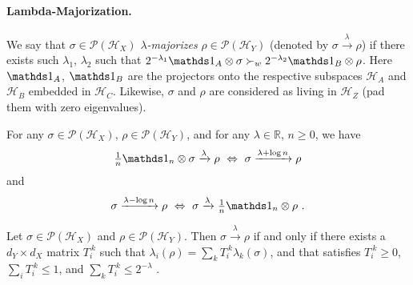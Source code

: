 \documentclass[12pt,a4paper]{article}
\def\Hs{\mathscr{H}}%
\newcommand{\lambdamaj}[1]{\xrightarrow{#1}}
\newcommand{\POps}{\mathscr{P}}
\begin{document}
\paragraph{Lambda-Majorization.} We say that $\sigma\in\POps(\Hs_X)$ {\em $\lambda$-majorizes}
$\rho\in\POps(\Hs_Y)$ (denoted by $\sigma\lambdamaj\lambda\rho$) if there exists such
$\lambda_1$, $\lambda_2$ such that
$2^{-\lambda_1}\Ident_A\otimes\sigma \succ_w 2^{-\lambda_2}\Ident_B\otimes\rho$.
Here $\Ident_A$, $\Ident_B$ are the projectors onto the respective subspaces $\Hs_A$ and $\Hs_B$
embedded in $\Hs_C$. Likewise, $\sigma$ and $\rho$ are considered as living in $\Hs_Z$ (pad them with zero
eigenvalues).

\begin{prop}
  \label{prop:LambdaMajMoveIdentitiesAround}
  For any $\sigma\in\POps(\Hs_X)$, $\rho\in\POps(\Hs_Y)$, and for any $\lambda\in\mathbb{R}$, $n\geqslant 0$, we have
  \begin{align*}
    {\textstyle\frac1n}\Ident_n\otimes\sigma\lambdamaj\lambda\rho  ~\Leftrightarrow~
    \sigma\lambdamaj{\lambda+\log n} \rho
  \end{align*}
  and
  \begin{align*}
    \sigma\lambdamaj{\lambda-\log n} \rho  ~\Leftrightarrow~
    \sigma\lambdamaj\lambda {\textstyle\frac1n}\Ident_n\otimes\rho\ .
  \end{align*}
\end{prop}

\begin{prop}
  \label{prop:LambdaMajTikFormal}
  Let $\sigma\in\POps(\Hs_X)$ and $\rho\in\POps(\Hs_Y)$. Then $\sigma\lambdamaj\lambda\rho$ if
  and only if there exists a $d_Y \times d_X$ matrix $T_i^{~k}$ such that
  $\lambda_i(\rho) = \sum_k T_i^{~k} \lambda_k(\sigma)$, and that satisfies
  $T_i^{~k}\geqslant 0$,
  $\sum_i T_i^{~k} \leqslant 1$, and
  $\sum_k T_i^{~k} \leqslant 2^{-\lambda}$ .
\end{prop}
\end{document}
